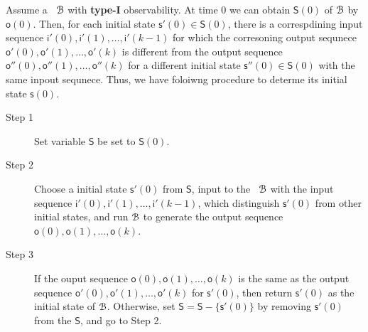 Assume a \BCN\ ${\mathcal{B}}$  with {\bf type-I}  observability. At time $0$ we can  obtain $\mathsf{S}(0)$ of ${\mathcal{B}}$ by $\mathsf{o}(0)$. Then, for each initial state $\mathsf{s}'(0)\in \mathsf{S}(0)$, there is a correspdining input sequence $\mathsf{i}'(0),\mathsf{i}'(1),\ldots, \mathsf{i}'(k-1)$ for which the corresoning output sequnece $\mathsf{o}'(0),\mathsf{o}'(1),\ldots,\mathsf{o}'(k)$ is different from the output sequence $\mathsf{o}''(0),\mathsf{o}''(1),\ldots,\mathsf{o}''(k)$ for a different initial state $\mathsf{s}''(0)\in \mathsf{S}(0)$ with the same inpout sequnece. Thus, we have foloiwng procedure to determe its initial state $\mathsf{s}(0)$.
\begin{description}
	\item[Step 1] Set variable $\mathsf{S}$ be set to $\mathsf{S}(0)$.
	\item[Step 2] Choose a initial state $\mathsf{s}'(0)$ from $\mathsf{S}$, input to the \BCN\ ${\mathcal{B}}$ with the input sequence $\mathsf{i}'(0),\mathsf{i}'(1),\ldots, \mathsf{i}'(k-1)$, which distinguish $\mathsf{s}'(0)$ from other initial states, and run ${\mathcal{B}}$ to generate the output sequence $\mathsf{o}(0),\mathsf{o}(1),\ldots,\mathsf{o}(k)$.
	\item[Step 3] If the ouput sequence $\mathsf{o}(0),\mathsf{o}(1),\ldots,\mathsf{o}(k)$ is the same as the output sequence $\mathsf{o}'(0),\mathsf{o}'(1),\ldots,\mathsf{o}'(k)$ for $\mathsf{s}'(0)$, then return $\mathsf{s}'(0)$ as the initial state of ${\mathcal{B}}$. Otherwise, set $\mathsf{S}=\mathsf{S}-\{\mathsf{s}'(0)\}$ by removing $\mathsf{s}'(0)$ from the $\mathsf{S}$, and go to Step 2.
	
\end{description}

